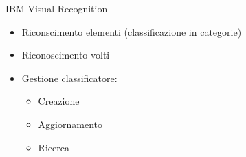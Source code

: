 %
\begin{frame}[t]{IBM Visual Recognition}
\begin{itemize}
	\item Riconscimento elementi (classificazione in categorie)
	\item Riconoscimento volti
	\item Gestione classificatore:
	\begin{itemize}
		\item Creazione
		\item Aggiornamento
		\item Ricerca
	\end{itemize}
\end{itemize}
\end{frame}
%
